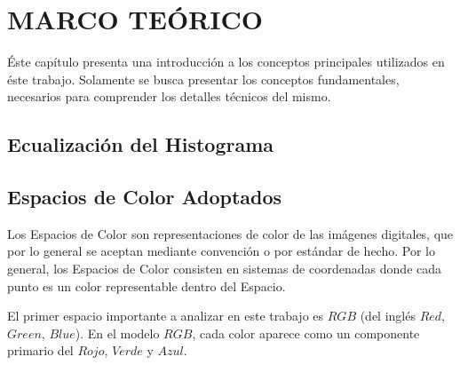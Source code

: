 \chapter{MARCO TEÓRICO}\label{sec:theorethical_framework}

Éste capítulo presenta una introducción a los conceptos principales utilizados en éste trabajo. Solamente se busca presentar los conceptos fundamentales, necesarios para comprender los detalles técnicos del mismo.

\section{Ecualización del Histograma}

\section{Espacios de Color Adoptados}\label{sec:color_spaces}

Los Espacios de Color \cite{Gonzalez02a} son representaciones de color de las imágenes digitales, que por lo general se aceptan mediante convención o por estándar de hecho. Por lo general, los Espacios de Color consisten en sistemas de coordenadas donde cada punto es un color representable dentro del Espacio.

El primer espacio importante a analizar en este trabajo es $RGB$ (del inglés $Red$, $Green$, $Blue$). En el modelo $RGB$, cada color aparece como un componente primario del $Rojo$, $Verde$ y $Azul$.

